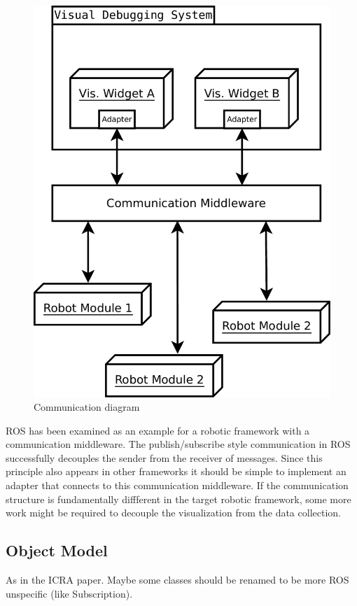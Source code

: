 \begin{figure}[htbp]
  \centering
  \includegraphics[width=.7\textwidth]{diagrams/communication_diagram}
  \caption{Communication diagram}
  \label{communication_diagram}
\end{figure}


\q
ROS has been examined as an example for a robotic framework with a communication middleware. The publish/subscribe style communication in ROS successfully decouples the sender from the receiver of messages. Since this principle also appears in other frameworks it should be simple to implement an adapter that connects to this communication middleware. If the communication structure is fundamentally diffferent in the target robotic framework, some more work might be required to decouple the visualization from the data collection.

\subsection{Object Model}
As in the ICRA paper. Maybe some classes should be renamed to be more ROS unspecific (like Subscription).


